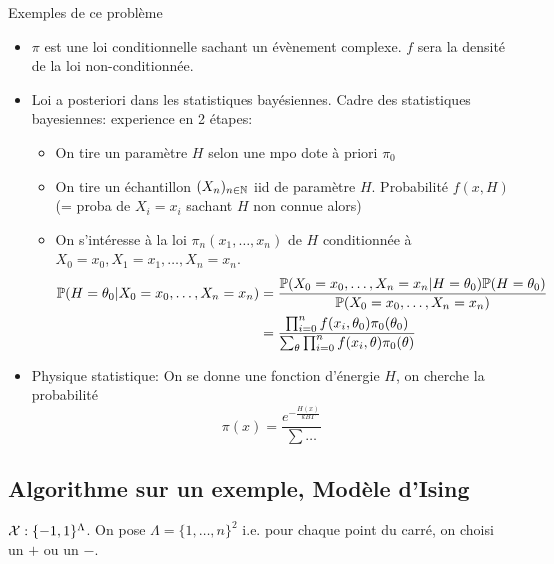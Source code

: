\documentclass[]{report}
\begin{document}
    \begin{ex}{Exemples de ce problème}{}
        \begin{itemize}
            \item $\pi$ est une loi conditionnelle sachant un évènement complexe. $f$ sera la densité de la loi non-conditionnée.
            \item Loi a posteriori dans les statistiques bayésiennes. Cadre des statistiques bayesiennes: experience en 2 étapes:
            \begin{itemize}
                \item On tire un paramètre $H$ selon une mpo dote à priori $\pi_0$
                \item On tire un échantillon $(X_n)_{n\in\mathbb{N}}$ iid de paramètre $H$. Probabilité $f(x,H)$ (= proba de $X_i=x_i$ sachant $H$ non connue alors)
                \item On s'intéresse à la loi $\pi_n(x_1,\ldots,x_n)$ de $H$ conditionnée à $X_0=x_0,X_1=x_1,\ldots,X_n=x_n$.
                \begin{align*}
                    \mathbb{P}(H=\theta_0|X_0=x_0,\ldots,X_n=x_n)&=\dfrac{\mathbb{P}(X_0=x_0,\ldots,X_n=x_n|H=\theta_0)\mathbb{P}(H=\theta_0)}{\mathbb{P}(X_0=x_0,\ldots,X_n=x_n)}\\
                    &=\dfrac{\prod_{i=0}^{n} f(x_i,\theta_0)\pi_0(\theta_0)}{\sum_\theta \prod_{i=0}^n f(x_i,\theta)\pi_0(\theta)}
                \end{align*}
            \end{itemize}
            \item Physique statistique: On se donne une fonction d'énergie $H$, on cherche la probabilité
            \[\pi(x)=\frac{e^{-\frac{H(x)}{kBT}}}{\sum\ldots}\]
        \end{itemize}
    \end{ex}

    \subsection*{Algorithme sur un exemple, Modèle d'Ising}

    $\mathcal{X}:\{-1,1\}^{\Lambda}$. On pose $\Lambda=\{1,\ldots,n\}^2$ i.e. pour chaque point du carré, on choisi un $+$ ou un $-$.
\end{document}

